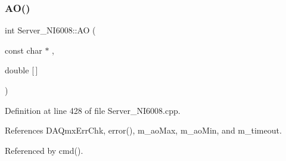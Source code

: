 \mbox{\label{classServer__NI6008_adde2efeb68363f67abb6d76c7ca2d761}} 
\subsubsection{\texorpdfstring{A\+O()}{AO()}}
{\footnotesize\ttfamily int Server\+\_\+\+N\+I6008\+::\+AO (\begin{DoxyParamCaption}\item[{const char $\ast$}]{,  }\item[{double}]{\mbox{[}$\,$\mbox{]} }\end{DoxyParamCaption})}



Definition at line 428 of file Server\+\_\+\+N\+I6008.\+cpp.



References D\+A\+Qmx\+Err\+Chk, error(), m\+\_\+ao\+Max, m\+\_\+ao\+Min, and m\+\_\+timeout.



Referenced by cmd().


